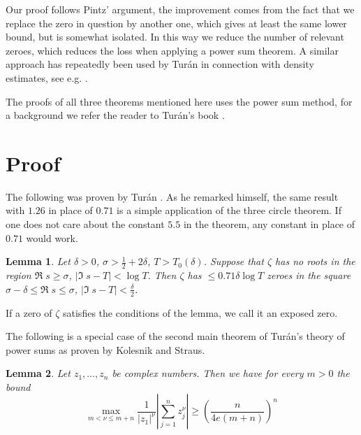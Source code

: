\documentclass{amsart}
\newtheorem{Lem}{Lemma}
\begin{document}
Our proof follows Pintz' argument, the improvement comes from the fact that we replace the zero in question by another one, which gives at least the same lower bound, but is somewhat isolated. In this way we reduce the number of relevant zeroes, which reduces the loss when applying a power sum theorem. A similar approach has repeatedly been used by Tur\'an in connection with density estimates, see e.g. \cite{Turan density}.

The proofs of all three theorems mentioned here uses the power sum method, for a background we refer the reader to Tur\'an's book \cite{Turan book}.

\section{Proof}


The following was proven by Tur\'an \cite{Turan density}. As he remarked himself, the same result with $1.26$ in place of $0.71$ is a simple application of the three circle theorem. If one does not care about the constant $5.5$ in the theorem, any constant in place of $0.71$ would work.

\begin{Lem}
\label{Lem:Turan}
Let $\delta>0$, $\sigma>\frac{1}{2}+2\delta$, $T>T_0(\delta)$. Suppose that $\zeta$ has no roots in the region $\Re\;s\geq\sigma$, $|\Im\;s-T|<\log T$. Then $\zeta$ has $\leq 0.71\delta\log T$ zeroes in the square $\sigma-\delta\leq\Re\;s\leq\sigma$, $|\Im\;s-T|<\frac{\delta}{2}$.
\end{Lem}
If a zero of $\zeta$ satisfies the conditions of the lemma, we call it an exposed zero.

The following is a special case of the second main theorem of Tur\'an's theory of power sums as proven by Kolesnik and Straus\cite{KSTuran}.
\begin{Lem}
Let $z_1, \ldots, z_n$ be complex numbers. Then we have for every $m>0$ the bound
\[
\max_{m<\nu\leq m+n}\frac{1}{|z_1|^\nu}\left|\sum_{j=1}^nz_j^\nu\right| \geq\left(\frac{n}{4e(m+n)}\right)^n
\]
\end{Lem}
\end{document}
